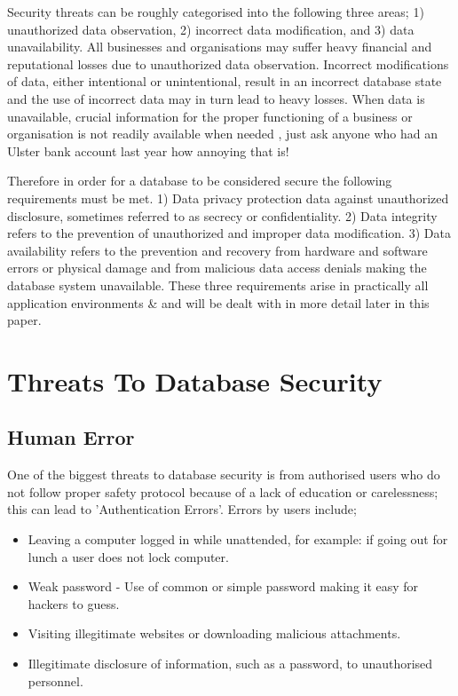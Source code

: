 \documentclass[11pt, twocolumn]{article}
\begin{document}
Security threats can be roughly categorised into the following three areas; 1) unauthorized data observation, 2) incorrect data modification, and 3) data unavailability.  All businesses and organisations may suffer heavy financial and reputational losses due to unauthorized data observation. Incorrect modifications of data, either intentional or unintentional, result in an incorrect database state and the use of incorrect data may in turn lead to heavy losses.  When data is unavailable, crucial information for the proper functioning of a business or organisation is not readily available when needed \cite{BerSand}, just ask anyone who had an Ulster bank account last year how annoying that is!  

Therefore in order for a database to be considered secure the following requirements must be met.  1) Data privacy protection data against unauthorized disclosure, sometimes referred to as secrecy or confidentiality.  2) Data integrity refers to the prevention of unauthorized and improper data modification.  3) Data availability refers to the prevention and recovery from hardware and software errors or physical damage and from malicious data access denials making the database system unavailable. These three requirements arise in practically all application environments \cite{BerSand}\&\cite{Thur} and will be dealt with in more detail later in this paper.



\section{Threats To Database Security}


\subsection{Human Error}
One of the biggest threats to database security is from authorised users who do not follow proper safety protocol because of a lack of education or carelessness; this can lead to 'Authentication Errors'\cite{Thur}.  Errors by users include;

\begin{itemize}
\item Leaving a computer logged in while unattended, for example: if going out for lunch a user does not lock computer.
\item Weak password - Use of common or simple password making it easy for hackers to guess.
\item Visiting illegitimate websites or downloading malicious attachments.
\item Illegitimate disclosure of information, such as a password, to unauthorised personnel\cite{Bas}.
\end{itemize}
\end{document}
